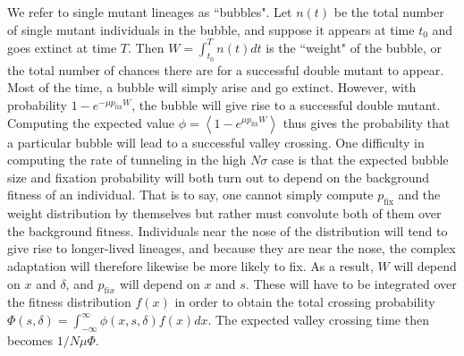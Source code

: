\documentclass[rmp]{revtex4}
\begin{document}
We refer to single mutant lineages as ``bubbles".
Let $n(t)$ be the total number of single mutant individuals in the bubble, and suppose it appears at time $t_0$ and goes extinct at time $T$.
Then $W = \int_{t_0}^T n(t)dt$ is the ``weight" of the bubble, or the total number of chances there are for a successful double mutant to appear.
Most of the time, a bubble will simply arise and go extinct.
However, with probability $1-e^{-\mu p_{\mathrm{fix}} W}$, the bubble will give rise to a successful double mutant.
Computing the expected value $\phi = \left< 1-e^{\mu p_{\mathrm {fix}} W} \right>$ thus gives the probability that a particular bubble will lead to a successful valley crossing.
One difficulty in computing the rate of tunneling in the high $N\sigma$ case is that the expected bubble size and fixation probability will both turn out to depend on the background fitness of an individual.
That is to say, one cannot simply compute $p_{\mathrm{fix}}$ and the weight distribution by themselves but rather must convolute both of them over the background fitness.
Individuals near the nose of the distribution will tend to give rise to longer-lived lineages, and because they are near the nose, the complex adaptation will therefore likewise be more likely to fix.
As a result, $W$ will depend on $x$ and $\delta$, and $p_{\mathrm fix}$ will depend on $x$ and $s$.
These will have to be integrated over the fitness distribution $f(x)$ in order to obtain the total crossing probability $\Phi(s,\delta) = \int_{-\infty}^\infty \phi(x,s,\delta) f(x) dx$.
The expected valley crossing time then becomes $1/N\mu\Phi$.
\end{document}

